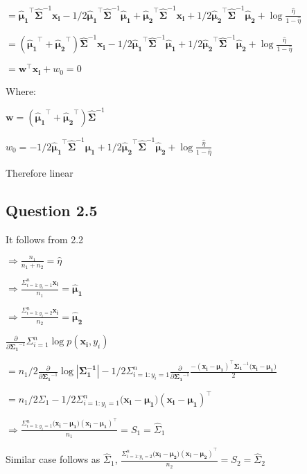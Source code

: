 \documentclass[
]{article}
\begin{document}
\(=\mathbf{\hat\mu_1}^\top\mathbf{\hat\Sigma}^{-1}\mathbf{x_i} -1/2 \mathbf{\hat\mu_1}^\top\mathbf{\hat\Sigma}^{-1}\mathbf{\hat\mu_1} + \mathbf{\hat\mu_2}^\top\mathbf{\hat\Sigma}^{-1}\mathbf{x_i} +1/2\mathbf{\hat\mu_2}^\top\mathbf{\hat\Sigma}^{-1}\mathbf{\hat\mu_2} + \log \frac{\hat\eta}{1-\hat\eta}\)

\(=(\mathbf{\hat\mu_1}^\top + \mathbf{\hat\mu_2}^\top)\mathbf{\hat\Sigma}^{-1}\mathbf{x_i} -1/2 \mathbf{\hat\mu_1}^\top\mathbf{\hat\Sigma}^{-1}\mathbf{\hat\mu_1} +1/2\mathbf{\hat\mu_2}^\top\mathbf{\hat\Sigma}^{-1}\mathbf{\hat\mu_2} + \log \frac{\hat\eta}{1-\hat\eta}\)

\(=\mathbf{w}^\top\mathbf{x_i} + w_0 = 0\)

Where:

\(\mathbf{w} = (\mathbf{\hat\mu_1}^\top + \mathbf{\hat\mu_2}^\top)\mathbf{\hat\Sigma}^{-1}\)

\(w_0 = -1/2 \mathbf{\hat\mu_1}^\top\mathbf{\hat\Sigma}^{-1}\mathbf{\hat\mu_1} +1/2\mathbf{\hat\mu_2}^\top\mathbf{\hat\Sigma}^{-1}\mathbf{\hat\mu_2} + \log \frac{\hat\eta}{1-\hat\eta}\)

Therefore linear

\hypertarget{question-2.5}{%
\subsection{Question 2.5}\label{question-2.5}}

It follows from 2.2

\(\Rightarrow \frac{n_1}{n_1 + n_2} = \hat\eta\)

\(\Rightarrow \frac{\Sigma_{i=1:y_i=1}^n\mathbf{x_i}}{n_1} = \mathbf{\hat \mu_1}\)

\(\Rightarrow \frac{\Sigma_{i=1:y_i=2}^n\mathbf{x_i}}{n_2} = \mathbf{\hat\mu_2}\)

\(\frac{\partial}{\partial\mathbf{\Sigma_1}^{-1}} \Sigma_{i=1}^n \log p(\mathbf{x_i}, y_i)\)

\(=n_1/2\frac{\partial}{\partial\mathbf{\Sigma_1}^{-1}}\log|\mathbf{\Sigma_1^{-1}}| - 1/2\Sigma_{i=1:y_i=1}^n\frac{\partial}{\partial\mathbf{\Sigma_1}^{-1}}\frac{-(\mathbf{x_i-\mu_1})^\top \mathbf{\Sigma_1}^{-1} (\mathbf{x_i-\mu_1)}}{2}\)

\(=n_1/2\Sigma_1 - 1/2\Sigma_{i=1:y_i=1}^n(\mathbf{x_i-\mu_1)(\mathbf{x_i-\mu_1})^\top}\)

\(\Rightarrow \frac{\Sigma_{i=1:y_i=1}^n(\mathbf{x_i-\mu_1)(\mathbf{x_i-\mu_1})^\top}}{n_1} = S_1 = \hat\Sigma_1\)

Similar case follows as \(\hat\Sigma_1\),
\(\frac{\Sigma_{i=1:y_i=2}^n(\mathbf{x_i-\mu_2)(\mathbf{x_i-\mu_2})^\top}}{n_2} = S_2 = \hat\Sigma_2\)
\end{document}
